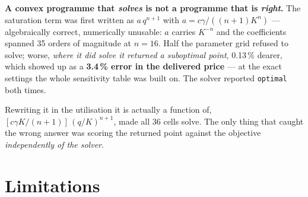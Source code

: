 \documentclass[11pt,a4paper]{article}
\begin{document}
\begin{keybox}
\textbf{A convex programme that \emph{solves} is not a programme that is \emph{right}.}
The saturation term was first written as $a\,q^{n+1}$ with $a = c\gamma/((n{+}1)K^{n})$
--- algebraically correct, numerically unusable: $a$ carries $K^{-n}$ and the coefficients
spanned 35 orders of magnitude at $n=16$. Half the parameter grid refused to solve; worse,
\emph{where it did solve it returned a suboptimal point}, 0.13\,\% dearer, which showed up
as a \textbf{3.4\,\% error in the delivered price} --- at the exact settings the whole
sensitivity table was built on. The solver reported \texttt{optimal} both times.

Rewriting it in the utilisation it is actually a function of,
$[c\gamma K/(n{+}1)]\,(q/K)^{n+1}$, made all 36 cells solve. The only thing that caught
the wrong answer was scoring the returned point against the objective \emph{independently
of the solver}.
\end{keybox}

\section{Limitations}
\label{sec:limits}
\end{document}
